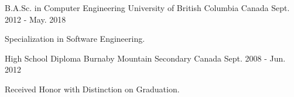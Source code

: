

\begin{cventries}

  \cventry
    {B.A.Sc. in Computer Engineering} %
    {University of British Columbia} %
    {Canada} %
    {Sept. 2012 - May. 2018} %
    {
      \begin{cvitems} %
        \item {Specialization in Software Engineering.}
      \end{cvitems}
    }
  \cventry
    {High School Diploma} %
    {Burnaby Mountain Secondary} %
    {Canada} %
    {Sept. 2008 - Jun. 2012} %
    {
      \begin{cvitems} %
        \item {Received Honor with Distinction on Graduation.}
      \end{cvitems}
    }
\end{cventries}
